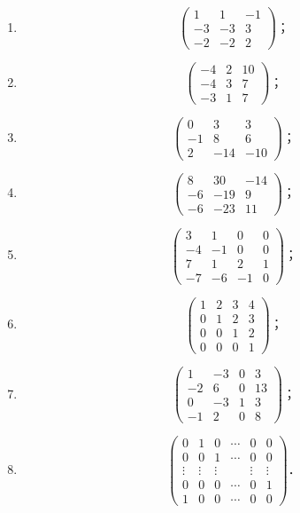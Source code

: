 \begin{enumerate}
\begin{enumerate}
\[\begin{pmatrix}
      2 & -2 & 4
    \end{pmatrix}\text{；}
    \]
  \anssub
    \item \[
    \begin{pmatrix}
      1 & 1 & -1 \\
      -3 & -3 & 3 \\
      -2 & -2 & 2
    \end{pmatrix}\text{；}
    \]
  \anssub
    \item \[
    \begin{pmatrix}
      -4 & 2 & 10 \\
      -4 & 3 & 7 \\
      -3 & 1 & 7
    \end{pmatrix}\text{；}
    \]
  \anssub
    \item \[
    \begin{pmatrix}
      0 & 3 & 3 \\
      -1 & 8 & 6 \\
      2 & -14 & -10
    \end{pmatrix}\text{；}
    \]
  \anssub
    \item \[
    \begin{pmatrix}
      8 & 30 & -14 \\
      -6 & -19 & 9 \\
      -6 & -23 & 11
    \end{pmatrix}\text{；}
    \]
  \anssub
    \item \[
    \begin{pmatrix}
      3 & 1 & 0 & 0 \\
      -4 & -1 & 0 & 0 \\
      7 & 1 & 2 & 1 \\
      -7 & -6 & -1 & 0
    \end{pmatrix}\text{；}
    \]
  \anssub
    \item \[
    \begin{pmatrix}
      1 & 2 & 3 & 4 \\
      0 & 1 & 2 & 3 \\
      0 & 0 & 1 & 2 \\
      0 & 0 & 0 & 1
    \end{pmatrix}\text{；}
    \]
  \anssub
    \item \[
    \begin{pmatrix}
      1 & -3 & 0 & 3 \\
      -2 & 6 & 0 & 13 \\
      0 & -3 & 1 & 3 \\
      -1 & 2 & 0 & 8
    \end{pmatrix}\text{；}
    \]
  \anssub
    \item \[
    \begin{pmatrix}
      0 & 1 & 0 & \cdots & 0 & 0 \\
      0 & 0 & 1 & \cdots & 0 & 0 \\
      \vdots & \vdots & \vdots & & \vdots & \vdots \\
      0 & 0 & 0 & \cdots & 0 & 1 \\
      1 & 0 & 0 & \cdots & 0 & 0
    \end{pmatrix}\text{．}
    \]
  \anssub
  \end{enumerate}


\end{enumerate}

